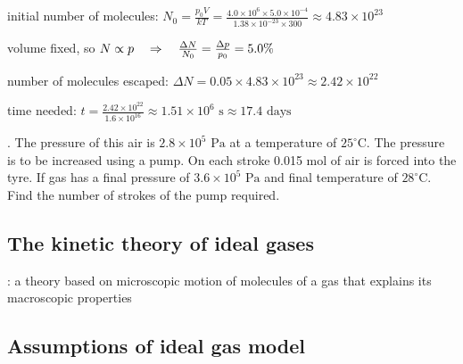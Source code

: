 \begin{soln} initial number of molecules: $N_0 = \frac{p_0V}{kT} = \frac{4.0\times10^6\times 5.0\times10^{-4}}{1.38\times10^{-23}\times300}\approx 4.83\times10^{23}$

\eqyskip

volume fixed, so $N \propto p \quad \Rightarrow \quad \frac{\Delta N}{N_0} = \frac{\Delta p}{p_0} = 5.0\%$

number of molecules escaped: $\Delta N = 0.05\times4.83\times10^{23} \approx 2.42 \times10^{22}$

time needed: $t = \frac{2.42 \times10^{22}}{1.6 \times 10^{16}} \approx 1.51 \times 10^6 \text{ s} \approx 17.4 \text{ days}$ \end{soln}

\newpage %


. The pressure of this air is $2.8\times10^5 \text{ Pa}$ at a temperature of $25^\circ$C. The pressure is to be increased using a pump. On each stroke 0.015 mol of air is forced into the tyre. If gas has a final pressure of $3.6\times10^5 \text{ Pa}$ and final temperature of $28^\circ$C. Find the number of strokes of the pump required.



\subsection{The kinetic theory of ideal gases}

: a theory based on microscopic motion of molecules of a gas that explains its macroscopic properties

\subsection{Assumptions of ideal gas model}


